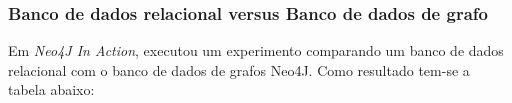 \documentclass{beamer}
\begin{document}

\begin{frame}
\frametitle{Banco de dados relacional versus Banco de dados de grafo}
Em \textit{Neo4J In Action}, \cite{p9} executou um
experimento comparando um banco de dados relacional com o banco de
dados de grafos Neo4J. Como resultado tem-se a tabela abaixo:
\begin{table}[!h]
\centering
  \large
  \setlength{\arrayrulewidth}{2\arrayrulewidth}
  \setlength{\belowcaptionskip}{10pt}
  \caption{\ Compara\c{c}\~ao MySQL versus Neo4J. \cite{p9}}
\label{tab:mysqlneo4j}
\end{table}
\end{frame}
\end{document}
